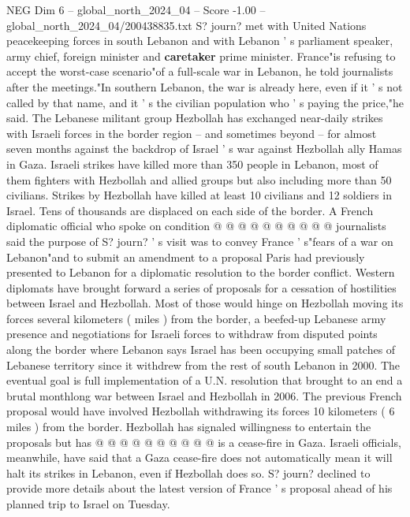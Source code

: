 \begin{textsample}{NEG Dim 6 – global\_north\_2024\_04 – Score -1.00 – global\_north\_2024\_04/200438835.txt}  \label{ex:f6_neg_343}
S? journ? met with United Nations peacekeeping forces in south Lebanon and with Lebanon ' s parliament speaker, army chief, foreign minister and \textbf{caretaker} prime minister.
France"is refusing to accept the worst-case scenario"of a full-scale war in Lebanon, he told journalists after the meetings."In southern Lebanon, the war is already here, even if it ' s not called by that name, and it ' s the civilian population who ' s paying the price,"he said.
The Lebanese militant group Hezbollah has exchanged near-daily strikes with Israeli forces in the border region -- and sometimes beyond -- for almost seven months against the backdrop of Israel ' s war against Hezbollah ally Hamas in Gaza.
Israeli strikes have killed more than 350 people in Lebanon, most of them fighters with Hezbollah and allied groups but also including more than 50 civilians.
Strikes by Hezbollah have killed at least 10 civilians and 12 soldiers in Israel.
Tens of thousands are displaced on each side of the border.
A French diplomatic official who spoke on condition @ @ @ @ @ @ @ @ @ @ journalists said the purpose of S? journ? ' s visit was to convey France ' s"fears of a war on Lebanon"and to submit an amendment to a proposal Paris had previously presented to Lebanon for a diplomatic resolution to the border conflict.
Western diplomats have brought forward a series of proposals for a cessation of hostilities between Israel and Hezbollah.
Most of those would hinge on Hezbollah moving its forces several kilometers ( miles ) from the border, a beefed-up Lebanese army presence and negotiations for Israeli forces to withdraw from disputed points along the border where Lebanon says Israel has been occupying small patches of Lebanese territory since it withdrew from the rest of south Lebanon in 2000.
The eventual goal is full implementation of a U.N. resolution that brought to an end a brutal monthlong war between Israel and Hezbollah in 2006.
The previous French proposal would have involved Hezbollah withdrawing its forces 10 kilometers ( 6 miles ) from the border.
Hezbollah has signaled willingness to entertain the proposals but has @ @ @ @ @ @ @ @ @ @ is a cease-fire in Gaza.
Israeli officials, meanwhile, have said that a Gaza cease-fire does not automatically mean it will halt its strikes in Lebanon, even if Hezbollah does so.
S? journ? declined to provide more details about the latest version of France ' s proposal ahead of his planned trip to Israel on Tuesday.

\end{textsample}

